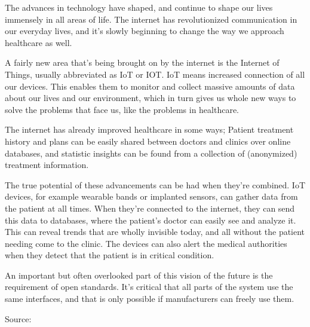 The advances in technology have shaped, and continue to shape our lives
immensely in all areas of life. The internet has revolutionized communication
in our everyday lives, and it's slowly beginning to change the way we approach
healthcare as well.

A fairly new area that's being brought on by the internet
is the Internet of Things, usually abbreviated as IoT or IOT. IoT means
increased connection of all our devices. This enables them to monitor and
collect massive amounts of data about our lives and our environment, which in
turn gives us whole new ways to solve the problems that face us, like the
problems in healthcare.

The internet has already improved healthcare in some ways; Patient treatment
history and plans can be easily shared between doctors and clinics over online
databases, and statistic insights can be found from a collection of
(anonymized) treatment information.

The true potential of these advancements can be had when they're combined. IoT
devices, for example wearable bands or implanted sensors, can gather data from
the patient at all times. When they're connected to the internet, they can send
this data to databases, where the patient's doctor can easily see and analyze
it. This can reveal trends that are wholly invisible today, and all without the
patient needing come to the clinic. The devices can also alert the medical
authorities when they detect that the patient is in critical condition.

An important but often overlooked part of this vision of the future is the
requirement of open standards. It's critical that all parts of the system use
the same interfaces, and that is only possible if manufacturers can freely use
them.


Source:~\cite{Bui2011}
